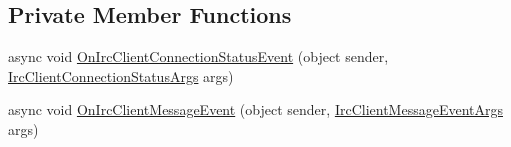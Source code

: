 \subsection*{Private Member Functions}
\begin{DoxyCompactItemize}
\item 
async void \mbox{\hyperlink{class_little_weeb_library_1_1_services_1_1_irc_web_socket_service_abd98810f045f0200700d8441a0c14902}{On\+Irc\+Client\+Connection\+Status\+Event}} (object sender, \mbox{\hyperlink{class_little_weeb_library_1_1_event_arguments_1_1_irc_client_connection_status_args}{Irc\+Client\+Connection\+Status\+Args}} args)
\item 
async void \mbox{\hyperlink{class_little_weeb_library_1_1_services_1_1_irc_web_socket_service_ab8023cd1161bcff9bebf2614764614fe}{On\+Irc\+Client\+Message\+Event}} (object sender, \mbox{\hyperlink{class_little_weeb_library_1_1_event_arguments_1_1_irc_client_message_event_args}{Irc\+Client\+Message\+Event\+Args}} args)
\end{DoxyCompactItemize}

